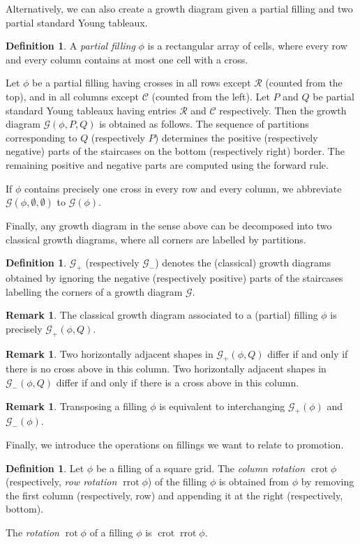 \documentclass[10pt]{article}
\theoremstyle{definition}
\newtheorem{defi}[theorem]{Definition}
\newtheorem{rema}[theorem]{Remark}
\newcommand{\Dfn}[1]{\emph{\color{blue}#1}}
\DeclareMathOperator{\rot}{rot} %
\DeclareMathOperator{\rrot}{rrot} %
\DeclareMathOperator{\crot}{crot} %
\newcommand{\Grm}{\mathcal{G}} %
\newcommand{\pos}[1]{#1_+} %
\renewcommand{\neg}[1]{#1_-} %
\begin{document}
Alternatively, we can also create a growth diagram given a partial
filling and two partial standard Young tableaux.
\begin{defi}
 A \Dfn{partial filling} $\phi$ is a rectangular array of cells,
 where every row and every column contains at most one cell with a
 cross.

 Let $\phi$ be a partial filling having crosses in all rows except
 $\mathcal R$ (counted from the top), and in all columns except
 $\mathcal C$ (counted from the left). Let $P$ and $Q$ be partial
 standard Young tableaux having entries $\mathcal R$ and
 $\mathcal C$ respectively. Then the growth diagram
 \Dfn{$\Grm(\phi, P, Q)$} is obtained as follows. The sequence of
 partitions corresponding to $Q$ (respectively $P$) determines the
 positive (respectively negative) parts of the staircases on the
 bottom (respectively right) border. The remaining positive and
 negative parts are computed using the forward rule.

 If $\phi$ contains precisely one cross in every row and every
 column, we abbreviate $\Grm(\phi,\emptyset,\emptyset)$ to
 \Dfn{$\Grm(\phi)$}.
\end{defi}

Finally, any growth diagram in the sense above can be decomposed into
two classical growth diagrams, where all corners are labelled by
partitions.
\begin{defi}
 \Dfn{$\pos\Grm $} (respectively \Dfn{$\neg\Grm$}) denotes the
 (classical) growth diagrams obtained by ignoring the negative
 (respectively positive) parts of the staircases labelling the
 corners of a growth diagram $\Grm$.
\end{defi}
\begin{rema}
 The classical growth diagram associated to a (partial) filling $\phi$ is precisely $\pos\Grm(\phi, Q)$.
\end{rema}
\begin{rema}
 Two horizontally adjacent shapes in $\pos\Grm(\phi, Q)$ differ if and only if there is no cross above in this column. Two horizontally adjacent shapes in $\neg\Grm(\phi, Q)$ differ if and only if there is a cross above in this column.
\end{rema}
\begin{rema}\label{prop:transposed-growth}
 Transposing a filling $\phi$ is equivalent to interchanging $\pos\Grm(\phi)$ and $\neg\Grm(\phi)$.
\end{rema}

Finally, we introduce the operations on fillings we want to relate to promotion.
\begin{defi}
 Let $\phi$ be a filling of a square grid. The \Dfn{column rotation $\crot\phi$} (respectively, \Dfn{row rotation $\rrot\phi$}) of the filling $\phi$ is obtained from $\phi$ by removing the first column (respectively, row) and appending it at the right (respectively, bottom).

 The \Dfn{rotation $\rot\phi$} of a filling $\phi$ is $\crot\rrot\phi$.
\end{defi}
\end{document}
